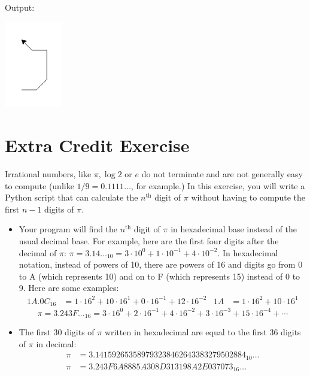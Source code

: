 \documentclass[11pt]{cselabheader}
\begin{document}
{\begin{ex}[navigate.py]
    Output:
    \begin{center}
    \includegraphics[width=1.0in]{img/navigate}
  \end{center}

\end{ex}

\vspace{3em}
\section{Extra Credit Exercise}
Irrational numbers, like $\pi, \log 2$ or $e$ do not terminate and are not generally easy to compute (unlike $1/9 = 0.1111\dots$, for example.)
In this exercise, you will write a Python script that can calculate the $n^\text{th}$ digit of $\pi$ without having to compute the first $n-1$ digits of $\pi$.

\begin{itemize}
\item Your program will find the $n^\text{th}$ digit of $\pi$ in hexadecimal base instead of the usual decimal base. For example, here are the first four digits after the decimal of $\pi$: $\pi = 3.14\dots_{10} = 3 \cdot 10^0 + 1 \cdot 10^{-1} + 4 \cdot 10^{-2}$.
In hexadecimal notation, instead of powers of 10, there are powers of 16 and digits go from 0 to A (which represents 10) and on to F (which represents 15) instead of 0 to 9. Here are some examples:
\begin{align*}
1A.0C_{16} &= 1 \cdot {16^2} + 10 \cdot 16^1 + 0 \cdot 16^{-1} + 12 \cdot 16^{-2}
&
1A &= 1 \cdot {16^2} + 10 \cdot 16^1
\end{align*}
\vspace{-1.5em}
$$\pi = 3.243F\dots_{16} = 3 \cdot 16^0 + 2 \cdot 16^{-1} + 4 \cdot 16^{-2} + 3 \cdot 16^{-3}
      + 15 \cdot 16^{-4} + \cdots
$$

\item The first 30 digits of $\pi$ written in hexadecimal are equal to the first 36 digits of $\pi$ in decimal:
\begin{align*}
\pi &= 3.141592653589793238462643383279502884_{10}\dots
\\
\pi &= 3.243F6A8885A308D313198A2E037073_{16}\dots
\end{align*}


\end{itemize}}
\end{document}
